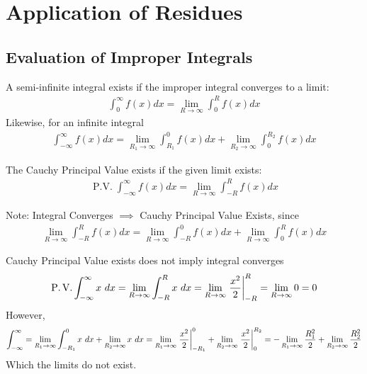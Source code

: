 \documentclass[12pt, english]{book}
\begin{document}
	\section{Application of Residues} \label{Application of Residues Section - Complex}
	
	\subsection{Evaluation of Improper Integrals} \label{Evaluation of Improper Integrals Subsection - Complex}
	
	\begin{definition}
		\label{Converge (Infinite Integral) Definition - Compleex}
		A semi-infinite integral exists if the improper integral converges to a limit:
		\begin{align*}
			\int_{0}^{\infty} f(x) dx = \lim_{R\rightarrow \infty} \int_{0}^{R} f(x) dx
		\end{align*}
		Likewise, for an infinite integral
		\begin{align*}
			\int_{-\infty}^{\infty} f(x) dx = \lim_{R_1 \rightarrow \infty} \int_{R_1}^{0} f(x) dx + \lim_{R_2 \rightarrow \infty} \int_{0}^{R_2} f(x) dx
		\end{align*}
	\end{definition}

	\begin{definition}
		\label{Cauchy Principal Value Definition - Complex}
		The Cauchy Principal Value exists if the given limit exists:
		\begin{align*}
			\operatorname{P.V.} \int_{-\infty}^{\infty} f(x) dx = \lim_{R\rightarrow \infty} \int_{-R}^{R} f(x) dx
		\end{align*}
	\end{definition}
	
	Note: Integral Converges \(\implies\) Cauchy Principal Value Exists, since 
	\begin{align*}
		\lim_{R\rightarrow \infty} \int_{-R}^{R} f(x) dx
		= \lim_{R\rightarrow \infty} \int_{-R}^{0} f(x) dx 
		+ \lim_{R\rightarrow \infty} \int_{0}^{R} f(x) dx
	\end{align*}
	
	\begin{example} Cauchy Principal Value exists does not imply integral converges
		\begin{align*}
			\operatorname{P.V.} \int_{-\infty}^{\infty} x \ dx 
			= \lim_{R \rightarrow \infty} \int_{-R}^{R} x \ dx 
			= \lim_{R \rightarrow \infty} \eval{\frac{x^2}{2}}_{-R}^{R} 
			= \lim_{R \rightarrow \infty} 0 = 0 
		\end{align*}
		However,
		\begin{align*}
			\int_{-\infty}^{\infty}
			= \lim_{R_1 \rightarrow \infty} \int_{-R_1}^{0} x \ dx + \lim_{R_2 \rightarrow \infty} x \ dx
			= \lim_{R_1 \rightarrow \infty} \eval{\frac{x^2}{2}}_{-R_1}^{0} + \lim_{R_2 \rightarrow \infty} \eval{\frac{x^2}{2}}_{0}^{R_2}
			= - \lim_{R_1 \rightarrow \infty} \frac{R_1^2}{2} + \lim_{R_2 \rightarrow \infty} \frac{R_2^2}{2}
		\end{align*}
		Which the limits do not exist. 
	\end{example}
	
\end{document}
